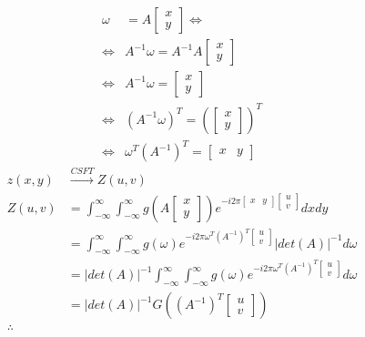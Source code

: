 \documentclass[11pt]{article}
\begin{document}
\begin{equation*}
\begin{split}
    \omega &= A \begin{bmatrix}
        x \\ y
    \end{bmatrix} \Leftrightarrow\\
    \Leftrightarrow &A^{-1} \omega = A^{-1}A\begin{bmatrix}
        x \\ y
    \end{bmatrix} \\
    \Leftrightarrow & A^{-1} \omega = \begin{bmatrix}
        x \\ y
    \end{bmatrix} \\
    \Leftrightarrow & (A^{-1} \omega)^T = (\begin{bmatrix}
        x \\ y
    \end{bmatrix})^T \\
    \Leftrightarrow  & \omega^T(A^{-1})^T =\begin{bmatrix}
        x & y
    \end{bmatrix}
\end{split}
\end{equation*}
\begin{equation*}
\begin{split}
    z(x,y)  & \xrightarrow{CSFT} Z(u,v) \\
    Z(u,v)  & = \int_{-\infty}^{\infty} \int_{-\infty}^{\infty} 
    g(A\begin{bmatrix}
        x \\ y
    \end{bmatrix})e^{-i2\pi 
    \begin{bmatrix}
        x & y
    \end{bmatrix}    
    \begin{bmatrix}
        u \\ v
    \end{bmatrix}
}dx dy \\ 
& = \int_{-\infty}^{\infty} \int_{-\infty}^{\infty} 
g(\omega)e^{-i2\pi \omega^T(A^{-1})^T 
\begin{bmatrix}
    u \\ v
\end{bmatrix}
} |det(A)|^{-1} d\omega \\
& = |det(A)|^{-1}\int_{-\infty}^{\infty} \int_{-\infty}^{\infty} 
g(\omega)e^{-i2\pi \omega^T(A^{-1})^T 
\begin{bmatrix}
    u \\ v
\end{bmatrix}
}  d\omega \\
& = |det(A)|^{-1}G((A^{-1})^T\begin{bmatrix}
    u \\ v
\end{bmatrix}) 
\\ \therefore{}
\end{split}
\end{equation*}
\end{document}
